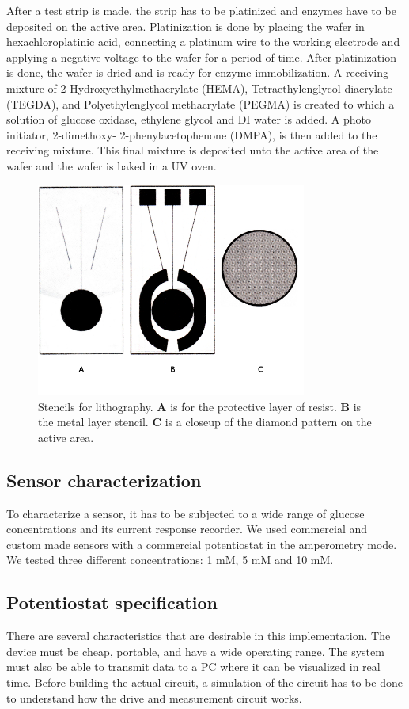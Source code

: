 After a test strip is made, the strip has to be platinized and enzymes have to be deposited on the active area. Platinization is done by placing the wafer in hexachloroplatinic acid, connecting a platinum wire to the working electrode and applying a negative voltage to the wafer for a period of time. After platinization is done, the wafer is dried and is ready for enzyme immobilization. A receiving mixture of 2-Hydroxyethylmethacrylate (HEMA), Tetraethylenglycol diacrylate (TEGDA), and Polyethylenglycol methacrylate (PEGMA) is created to which a solution of glucose oxidase, ethylene glycol and DI water is added. A photo initiator, 2-dimethoxy- 2-phenylacetophenone (DMPA), is then added to the receiving mixture. This final mixture is deposited unto the active area of the wafer and the wafer is baked in a UV oven. 

\begin{figure} 
\begin{center}
\includegraphics[width=3.5in]{../figures/stencils.png}
\end{center}
\caption{Stencils for lithography. {\bf A} is for the protective layer of resist. {\bf B} is the metal layer stencil. {\bf C} is a closeup of the diamond pattern on the active area.}
\label{fig:stencils}
\end{figure}


\subsection{Sensor characterization}
To characterize a sensor, it has to be subjected to a wide range of glucose concentrations and its current response recorder. We used commercial and custom made sensors with a commercial potentiostat in the amperometry mode. We tested three different concentrations: 1 mM, 5 mM and 10 mM.

\subsection{Potentiostat specification}
There are several characteristics that are desirable in this implementation. The device must be cheap, portable, and have a wide operating range. The system must also be able to transmit data to a PC where it can be visualized in real time. Before building the actual circuit, a simulation of the circuit has to be done to understand how the drive and measurement circuit works.


